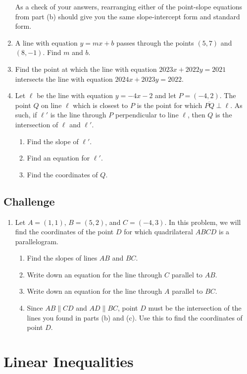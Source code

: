 \documentclass{article}
\begin{document}
\begin{enumerate}
As a check of your answers, rearranging either of the point-slope equations from part (b) should give you the same slope-intercept form and standard form.
\item A line with equation $y = mx + b$ passes through the points $(5,7)$ and $(8,-1)$. Find $m$ and $b$.
\item Find the point at which the line with equation $2023x + 2022y = 2021$ intersects the line with equation $2024x + 2023y = 2022$.
\item Let $\ell$ be the line with equation $y = -4x - 2$ and let $P = (-4, 2)$. The point $Q$ on line $\ell$ which is closest to $P$ is the point for which $\overline{PQ}\perp\ell$. As such, if $\ell'$ is the line through $P$ perpendicular to line $\ell$, then $Q$ is the intersection of $\ell$ and $\ell'$.
\begin{enumerate}
\item Find the slope of $\ell'$.
\item Find an equation for $\ell'$.
\item Find the coordinates of $Q$.
\end{enumerate}
\end{enumerate}

\subsection{Challenge}

\begin{enumerate}[resume]
\item Let $A = (1,1)$, $B = (5,2)$, and $C = (-4,3)$. In this problem, we will find the coordinates of the point $D$ for which quadrilateral $ABCD$ is a parallelogram.
\begin{enumerate}
\item Find the slopes of lines $AB$ and $BC$.
\item Write down an equation for the line through $C$ parallel to $AB$.
\item Write down an equation for the line through $A$ parallel to $BC$.
\item Since $AB\parallel CD$ and $AD\parallel BC$, point $D$ must be the intersection of the lines you found in parts (b) and (c). Use this to find the coordinates of point $D$.
\end{enumerate}
\end{enumerate}


\section{Linear Inequalities}
\end{document}
